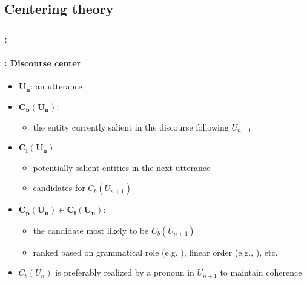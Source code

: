 \documentclass[xcolor=table]{beamer}
\begin{document}
\subsection{Centering theory}

\begin{frame}
	\frametitle{\insertshortsubtitle: \insertsection}
	\framesubtitle{\insertsubsection: Discourse center}
	
	\begin{itemize}
		\item $\mathbf{U_n}$: an utterance
		\item $\mathbf{C_b(U_n)}$: 
		\begin{itemize}
			\item the entity currently salient in the discourse following $U_{n-1}$
		\end{itemize}
		\item $\mathbf{C_f(U_n)}$: 
		\begin{itemize}
			\item potentially salient entities in the next utterance
			\item candidates for $C_b(U_{n+1})$
		\end{itemize}
		\item $\mathbf{C_p(U_n) \in C_f(U_n)}$: 
		\begin{itemize}
			\item the candidate most likely to be $C_b(U_{n+1})$
			\item ranked based on grammatical role (e.g. ), linear order (e.g., ), etc.
		\end{itemize}
		\item $C_b(U_n)$ is preferably realized by a pronoun in $U_{n+1}$ to maintain coherence
	\end{itemize}
	
\end{frame}
\end{document}
